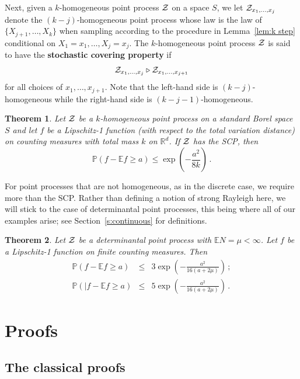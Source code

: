 \documentclass[10pt]{article}
\theoremstyle{plain}
\newtheorem{thm}{Theorem}[section]
\theoremstyle{remark}
\newcommand{\Em}[1]{\textbf{#1}}
\def\R{\mathbb{R}}
\def\E{{\mathbb E}}
\def\P{{\mathbb P}}
\def\ZZ{{\cal Z}}
\def\mcovers{\triangleright}
\def\mean{\mu}
\begin{document}
Next, given a $k$-homogeneous
point process $\ZZ$ on a space $S$, we let $\ZZ_{x_1 , \ldots , x_j}$
denote the $(k-j)$-homogeneous point process whose law
is the law of $\{ X_{j+1} , \ldots , X_k \}$ when sampling
according to the procedure in Lemma~\ref{lem:k step}
conditional on $X_1 = x_1 , \ldots , X_j = x_j$.
The $k$-homogeneous point process $\ZZ$ is said to have the
\Em{stochastic covering property} if
$$\ZZ_{x_1 , \ldots , x_j} \mcovers \ZZ_{x_1 , \ldots , x_{j+1}}$$
for all choices of $x_1 , \ldots , x_{j+1}$.  Note
that the left-hand side is $(k-j)$-homogeneous while
the right-hand side is $(k-j-1)$-homogeneous.
%
\begin{thm} \label{th:cont homog}
Let $\ZZ$ be a $k$-homogeneous point process on a standard
Borel space $S$ and
let $f$ be a Lipschitz-1 function (with respect to the total
variation distance) on counting measures with
total mass $k$ on $\R^d$.  If $\ZZ$ has the SCP, then
$$\P (f - \E f \geq a)
   \leq \exp \left ( - \frac{a^2}{8k} \right ) \, .$$
\end{thm}

For point processes that are not homogeneous, as in the
discrete case, we require more than the SCP.  Rather than
defining a notion of strong Rayleigh here, we will stick
to the case of determinantal point processes, this being
where all of our examples arise; see Section~\ref{s:continuous}
for definitions.
%
\begin{thm} \label{th:continuous}
Let $\ZZ$ be a determinantal point process with $\E N = \mean < \infty$.
Let $f$ be a Lipschitz-1 function on finite counting measures.  Then
\begin{eqnarray*}
\P (f - \E f \geq a )
   & \leq & 3 \exp \left ( - \frac{a^2}{16 (a + 2\mean)} \right )
   \, ; \\[1ex]
\P (|f - \E f \geq a )
   & \leq & 5 \exp \left ( - \frac{a^2}{16 (a + 2\mean)} \right ) \, .
\end{eqnarray*}
\end{thm}

\section{Proofs} \label{sec:proofs}

\subsection{The classical proofs}
\end{document}
